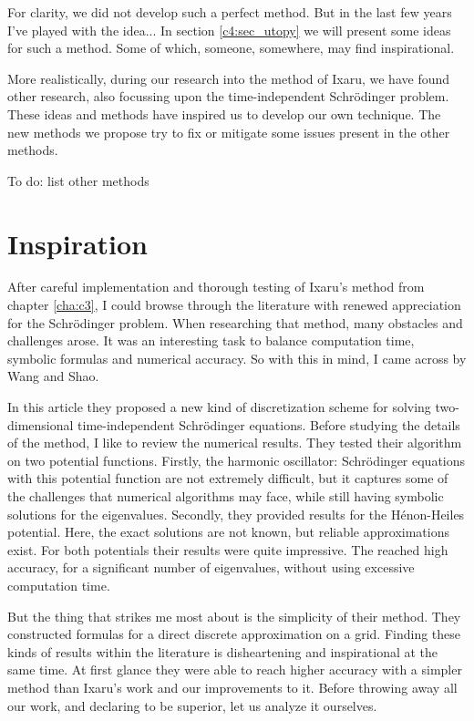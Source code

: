 For clarity, we did not develop such a perfect method. But in the last few years I've played with the idea... In section \ref{c4:sec_utopy} we will present some ideas for such a method. Some of which, someone, somewhere, may find inspirational.

More realistically, during our research into the method of Ixaru, we have found other research, also focussing upon the time-independent Schrödinger problem. These ideas and methods have inspired us to develop our own technique. The new methods we propose try to fix or mitigate some issues present in the other methods.

    {\color{red} To do: list other methods}

\section{Inspiration}

After careful implementation and thorough testing of Ixaru's method from chapter \ref{cha:c3}, I could browse through the literature with renewed appreciation for the Schrödinger problem. When researching that method, many obstacles and challenges arose. It was an interesting task to balance computation time, symbolic formulas and numerical accuracy. So with this in mind, I came across \cite{wang_new_2009} by Wang and Shao.

In this article they proposed a new kind of discretization scheme for solving two-dimensional time-independent Schrödinger equations. Before studying the details of the method, I like to review the numerical results. They tested their algorithm on two potential functions. Firstly, the harmonic oscillator: Schrödinger equations with this potential function are not extremely difficult, but it captures some of the challenges that numerical algorithms may face, while still having symbolic solutions for the eigenvalues. Secondly, they provided results for the Hénon-Heiles potential. Here, the exact solutions are not known, but reliable approximations exist. For both potentials their results were quite impressive. The reached high accuracy, for a significant number of eigenvalues, without using excessive computation time.

But the thing that strikes me most about \cite{wang_new_2009} is the simplicity of their method. They constructed formulas for a direct discrete approximation on a grid. Finding these kinds of results within the literature is disheartening and inspirational at the same time. At first glance they were able to reach higher accuracy with a simpler method than Ixaru's work \cite{ixaru_new_2010} and our improvements \cite{baeyens_improvements_2022} to it. Before throwing away all our work, and declaring \cite{wang_new_2009} to be superior, let us analyze it ourselves.

